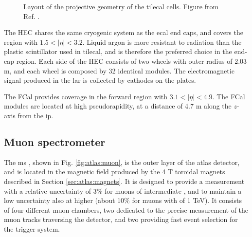 \begin{figure}[ht]
\centering
{}
\caption{Layout of the projective geometry of the \gls{tilecal} cells. Figure from Ref. \cite{atlas:atlas}.}
\label{fig:atlas:tile_cells}
\end{figure}

The HEC shares the same cryogenic system as the \gls{ecal} end caps, and covers the region with $1.5<|\eta|<3.2$. Liquid argon is more resistant to radiation than the plastic scintillator used in \gls{tilecal}, and is therefore the preferred choice in the end-cap region. Each side of the HEC consists of two wheels with outer radius of 2.03 m, and each wheel is composed by 32 identical modules. The electromagnetic signal produced in the \gls{lar} is collected by cathodes on the plates. 

The FCal provides coverage in the forward region with $3.1<|\eta|<4.9$. The FCal modules are located at high pseudorapidity, at a distance of 4.7 m along the $z$-axis from the \gls{ip}.


\subsection{Muon spectrometer}

The \gls{ms} \cite{ATLAS:1997ad}, shown in Fig. \ref{fig:atlas:muon}, is the outer layer of the \gls{atlas} detector, and is located in the magnetic field produced by the 4 T toroidal magnets described in Section \ref{sec:atlas:magnets}. It is designed to provide a \pt measurement with a relative uncertainty of 3\% for muons of intermediate \pt, and to maintain a low uncertainty also at higher \pt (about 10\% for muons with \pt of 1 TeV). It consists of four different muon chambers, two dedicated to the precise measurement of the muon tracks traversing the detector, 
and two providing fast event selection for the trigger system. 


